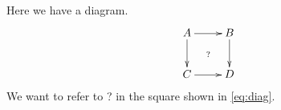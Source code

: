 \documentclass{article}
\newcommand{\refsymbol}{{?}}
\begin{document}
Here we have a diagram.
		\begin{equation}
			\xymatrix{
			  A \ar[r] \ar[d]
			  \ar@{}[dr] | {\refsymbol}
			  & B \ar[d] \\
			  C \ar[r] & D
			}
		\label{eq:diag}
	\end{equation}
We want to refer to {\refsymbol} in the square shown in \eqref{eq:diag}.
\end{document}
